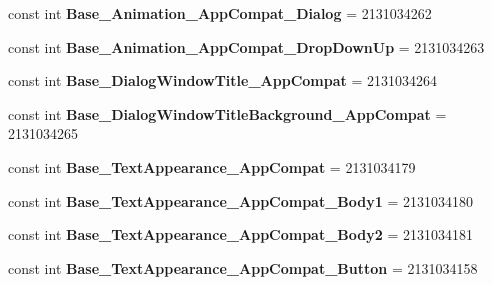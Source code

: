 \begin{DoxyCompactItemize}
\item 
\hypertarget{classClient_1_1Droid_1_1Resource_1_1Style_ab0d6f4d4fc49d180f23a6359da21cff4}{}const int {\bfseries Base\+\_\+\+Animation\+\_\+\+App\+Compat\+\_\+\+Dialog} = 2131034262\label{classClient_1_1Droid_1_1Resource_1_1Style_ab0d6f4d4fc49d180f23a6359da21cff4}

\item 
\hypertarget{classClient_1_1Droid_1_1Resource_1_1Style_a61a5a1d4002caae29f1278ad6099335a}{}const int {\bfseries Base\+\_\+\+Animation\+\_\+\+App\+Compat\+\_\+\+Drop\+Down\+Up} = 2131034263\label{classClient_1_1Droid_1_1Resource_1_1Style_a61a5a1d4002caae29f1278ad6099335a}

\item 
\hypertarget{classClient_1_1Droid_1_1Resource_1_1Style_a7e57ab9293e2cb229c749c5feb56c163}{}const int {\bfseries Base\+\_\+\+Dialog\+Window\+Title\+\_\+\+App\+Compat} = 2131034264\label{classClient_1_1Droid_1_1Resource_1_1Style_a7e57ab9293e2cb229c749c5feb56c163}

\item 
\hypertarget{classClient_1_1Droid_1_1Resource_1_1Style_a8b812660eee24e154d90e70bfb7a3f98}{}const int {\bfseries Base\+\_\+\+Dialog\+Window\+Title\+Background\+\_\+\+App\+Compat} = 2131034265\label{classClient_1_1Droid_1_1Resource_1_1Style_a8b812660eee24e154d90e70bfb7a3f98}

\item 
\hypertarget{classClient_1_1Droid_1_1Resource_1_1Style_a6ca2eb224a0fed2cce52da0091c21760}{}const int {\bfseries Base\+\_\+\+Text\+Appearance\+\_\+\+App\+Compat} = 2131034179\label{classClient_1_1Droid_1_1Resource_1_1Style_a6ca2eb224a0fed2cce52da0091c21760}

\item 
\hypertarget{classClient_1_1Droid_1_1Resource_1_1Style_a0dcc536479ec353453a70714ae73885a}{}const int {\bfseries Base\+\_\+\+Text\+Appearance\+\_\+\+App\+Compat\+\_\+\+Body1} = 2131034180\label{classClient_1_1Droid_1_1Resource_1_1Style_a0dcc536479ec353453a70714ae73885a}

\item 
\hypertarget{classClient_1_1Droid_1_1Resource_1_1Style_aa39d14087b014d22d5a3abd854e514d1}{}const int {\bfseries Base\+\_\+\+Text\+Appearance\+\_\+\+App\+Compat\+\_\+\+Body2} = 2131034181\label{classClient_1_1Droid_1_1Resource_1_1Style_aa39d14087b014d22d5a3abd854e514d1}

\item 
\hypertarget{classClient_1_1Droid_1_1Resource_1_1Style_aa39581a60499a66f0a6d006b5d122128}{}const int {\bfseries Base\+\_\+\+Text\+Appearance\+\_\+\+App\+Compat\+\_\+\+Button} = 2131034158\label{classClient_1_1Droid_1_1Resource_1_1Style_aa39581a60499a66f0a6d006b5d122128}


\end{DoxyCompactItemize}
